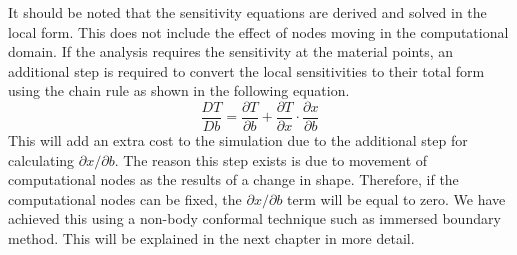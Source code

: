 %
It should be noted that the sensitivity equations are derived and solved in the local form. This does not include the effect of nodes moving in the computational domain. If the analysis requires the sensitivity at the material points, an additional step is required to convert the local sensitivities to their total form using the chain rule as shown in the following equation.
%
\begin{equation*}
    \frac{DT}{Db} = \frac{\partial T}{\partial b} + \frac{\partial T}{\partial x} \cdot \frac{\partial x}{\partial b}
\end{equation*}
%
This will add an extra cost to the simulation due to the additional step for calculating $\partial x/\partial b$. The reason this step exists is due to movement of computational nodes as the results of a change in shape. Therefore, if the computational nodes can be fixed, the $\partial x/\partial b$ term will be equal to zero. We have achieved this using a non-body conformal technique such as immersed boundary method. This will be explained in the next chapter in more detail.
